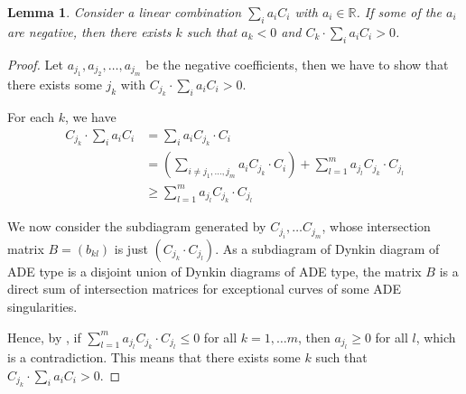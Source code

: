 \documentclass[12pt]{amsart}
\newtheorem{lemma}[theorem]{Lemma}
\theoremstyle{definition}
\begin{document}
\begin{lemma}\label{cartan}
Consider a linear combination $\displaystyle \sum_i a_iC_i$ with $a_i \in \mathbb{R}$.
If some of the $a_i$ are negative,
then there exists $k$ such that $a_k <0 $ and $\displaystyle C_k \cdot \sum_i a_iC_i >0$.
\end{lemma}
\begin{proof}
Let $a_{j_1}, a_{j_2},\dots,a_{j_m}$ be the negative coefficients, 
then we have to show that there exists some $j_k$ with $\displaystyle C_{j_k} \cdot \sum_i a_iC_i >0$.

For each $k$, we have
\begin{equation*} 
\begin{split}
\displaystyle C_{j_k} \cdot \sum_i a_iC_i &= \sum_i a_i C_{j_k}\cdot C_i \\
&= (\sum_{i\neq j_1,\dots,j_m}a_i C_{j_k}\cdot C_i ) +\sum^m_{l=1}a_{j_l}C_{j_k}\cdot C_{j_l} \\
&\geq \sum^m_{l=1}a_{j_l}C_{j_k}\cdot C_{j_l} 
\end{split}
\end{equation*}

We now consider the subdiagram generated by $C_{j_i}, \dots C_{j_m}$,
whose intersection matrix $B=(b_{kl})$ is just $(C_{j_k}\cdot C_{j_l} )$.
As a subdiagram of Dynkin diagram of ADE type is a disjoint union of Dynkin diagrams of ADE type,
the matrix $B$ is a direct sum of intersection matrices for exceptional curves of some ADE singularities.

Hence, by \cite[Proposition 10.18(iii)]{Car05}, if  $\displaystyle   \sum^m_{l=1} a_{j_l} C_{j_k} \cdot C_{j_l}\leq 0$ for all $k= 1, \dots m$,
then $a_{j_l} \geq 0$ for all $l$,
which is a contradiction.
This means that there exists some $k$ such that $\displaystyle C_{j_k} \cdot \sum_i a_iC_i >0$.
\end{proof}
\end{document}
